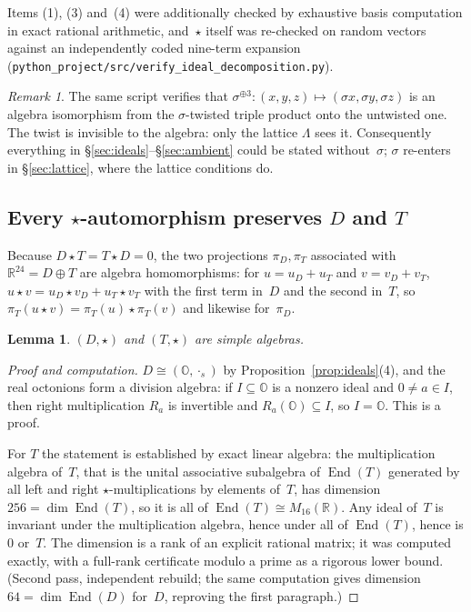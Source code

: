 \documentclass[11pt]{amsart}
\newcommand{\LL}{\Lambda}
\newcommand{\OO}{\mathbb{O}}
\newcommand{\RR}{\mathbb{R}}
\DeclareMathOperator{\End}{End}
\newtheorem{lemma}[theorem]{Lemma}
\theoremstyle{definition}
\theoremstyle{remark}
\newtheorem{remark}[theorem]{Remark}
\begin{document}
Items (1), (3) and~(4) were additionally checked by exhaustive basis
computation in exact rational arithmetic, and~$\star$ itself was re-checked
on random vectors against an independently coded nine-term expansion
(\texttt{python\_project/src/verify\_ideal\_decomposition.py}).

\begin{remark}
The same script verifies that
$\sigma^{\oplus 3} : (x,y,z) \mapsto (\sigma x, \sigma y, \sigma z)$ is an
algebra isomorphism from the $\sigma$-twisted triple product onto the
untwisted one. The twist is invisible to the algebra: only the lattice
$\LL$ sees it. Consequently everything in
\S\ref{sec:ideals}--\S\ref{sec:ambient} could be stated without~$\sigma$;
$\sigma$ re-enters in \S\ref{sec:lattice}, where the lattice conditions do.
\end{remark}

\subsection*{Every $\star$-automorphism preserves $D$ and $T$}

Because $D \star T = T \star D = 0$, the two projections
$\pi_D, \pi_T$ associated with $\RR^{24} = D \oplus T$ are algebra
homomorphisms: for $u = u_D + u_T$ and $v = v_D + v_T$,
$u \star v = u_D \star v_D + u_T \star v_T$ with the first term in~$D$ and
the second in~$T$, so
$\pi_T(u \star v) = \pi_T(u) \star \pi_T(v)$ and likewise for~$\pi_D$.

\begin{lemma}\label{lem:simple}
$(D, \star)$ and $(T, \star)$ are simple algebras.
\end{lemma}

\begin{proof}[Proof and computation]
$D \cong (\OO, \cdot_s)$ by Proposition~\ref{prop:ideals}(4), and the real
octonions form a division algebra: if $I \subseteq \OO$ is a nonzero ideal
and $0 \neq a \in I$, then right multiplication $R_a$ is invertible and
$R_a(\OO) \subseteq I$, so $I = \OO$. This is a proof.

For $T$ the statement is established by exact linear algebra: the
multiplication algebra of~$T$, that is the unital associative subalgebra of
$\End(T)$ generated by all left and right $\star$-multiplications by
elements of~$T$, has dimension~$256 = \dim \End(T)$, so it is all of
$\End(T) \cong M_{16}(\RR)$. Any ideal of~$T$ is invariant under the
multiplication algebra, hence under all of $\End(T)$, hence is $0$ or~$T$.
The dimension is a rank of an explicit rational matrix; it was computed
exactly, with a full-rank certificate modulo a prime as a rigorous lower
bound. (Second pass, independent rebuild; the same computation gives
dimension~$64 = \dim\End(D)$ for~$D$, reproving the first paragraph.)
\end{proof}
\end{document}
